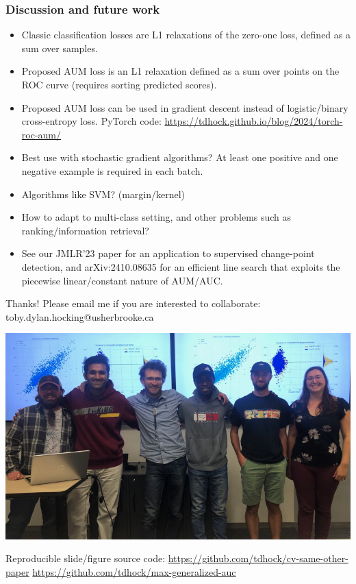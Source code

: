 \documentclass[t]{beamer}
\begin{document}
\begin{frame}
  \frametitle{Discussion and future work}
  \begin{itemize}
  \item Classic classification losses are L1 relaxations of the zero-one loss, defined as a sum over samples.
  \item Proposed AUM loss is an L1 relaxation defined as a sum over
    points on the ROC curve (requires sorting predicted scores).
  \item Proposed AUM loss can be used in gradient descent instead of logistic/binary cross-entropy loss. PyTorch code: \url{https://tdhock.github.io/blog/2024/torch-roc-aum/}
  \item Best use with stochastic gradient algorithms?
    At least one positive and one negative example is required in each
    batch.
  \item Algorithms like SVM? (margin/kernel)
  \item How to adapt to multi-class setting, and other problems such as
    ranking/information retrieval?
  \item See our JMLR'23 paper for an application to supervised
    change-point detection, and arXiv:2410.08635 for an efficient line
    search that exploits the piecewise linear/constant nature of
    AUM/AUC.
  \end{itemize}
\end{frame}

\begin{frame}
  Thanks! Please email me if you are interested to collaborate: toby.dylan.hocking@usherbrooke.ca

  \includegraphics[width=\textwidth]{2022-10-14_ML_group_meeting}

  Reproducible slide/figure source code: \url{https://github.com/tdhock/cv-same-other-paper} \url{https://github.com/tdhock/max-generalized-auc}
\end{frame}
\end{document}

